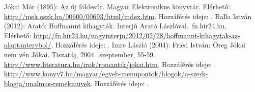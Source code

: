 \documentclass{thesis-ekf}
\begin{document}
    \begin{thebibliography}{}
         Jókai Mór (1895): Az új földesúr. Magyar Elektronikus könyvtár.
            Elérhető: \url{http://mek.oszk.hu/00600/00693/html/index.htm}. Hozzáférés ideje: .
         Balla István (2012): Arató: Hoffmannt kihagyták. Interjú Arató Lászlóval.~fn.hir24.hu, 
            Elérhető: \url{http://fn.hir24.hu/nagyinterju/2012/02/28/hoffmannt-kihagytak-az-alaptantervbol/}. Hozzáférés ideje: .
         Imre László (2004): Fried István: Öreg Jókai nem vén Jókai. Tiszatáj, 2004.~szeptember, 55-59.
         \url{http://www.literatura.hu/irok/romantik/jokai.htm}. Hozzáférés ideje: .
         \url{http://www.konyv7.hu/magyar/egyeb-menupontok/blogok/a-szerk-blogja/unalmas-remekmuvek}.
            Hozzáférés ideje: .
    \end{thebibliography}
\end{document}
